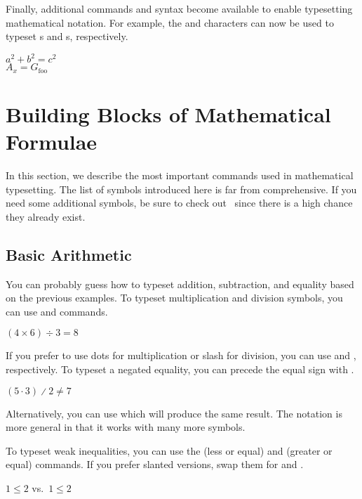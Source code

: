 Finally, additional commands and syntax become available to enable typesetting
mathematical notation. For example, the \ai{\^{}} and \ai{\_} characters can
now be used to typeset s and s, respectively.
\begin{example}
\( a^2 + b^2 = c^2 \) \\
\( A_x = G_{\text{foo}} \)
\end{example}

\section{Building Blocks of Mathematical Formulae}

In this section, we describe the most important commands used in mathematical
typesetting. The list of symbols introduced here is far from comprehensive. If
you need some additional symbols, be sure to check out~\cite{detexify,
  unicode-math-symbols, latexcomp} since there is a high chance they already
exist.

\subsection{Basic Arithmetic}

You can probably guess how to typeset addition, subtraction, and equality based
on the previous examples. To typeset multiplication and division symbols, you
can use  and  commands.
\begin{example}
\( (4 \times 6) \div 3 = 8 \)
\end{example}
If you prefer to use dots for multiplication or slash for division, you can use
 and , respectively. To typeset a negated equality, you
can precede the equal sign with .
\begin{example}
\( (5 \cdot 3) \divslash 2
  \not= 7 \)
\end{example}
Alternatively, you can use  which will produce the same result. The
 notation is more general in that it works with many more symbols.

To typeset weak inequalities, you can use the  (less or equal) and
 (greater or equal) commands. If you prefer slanted versions, swap them
for  and .
\begin{example}
\( 1 \leq 2 \) vs.\
\(1 \leqslant 2\)
\end{example}

